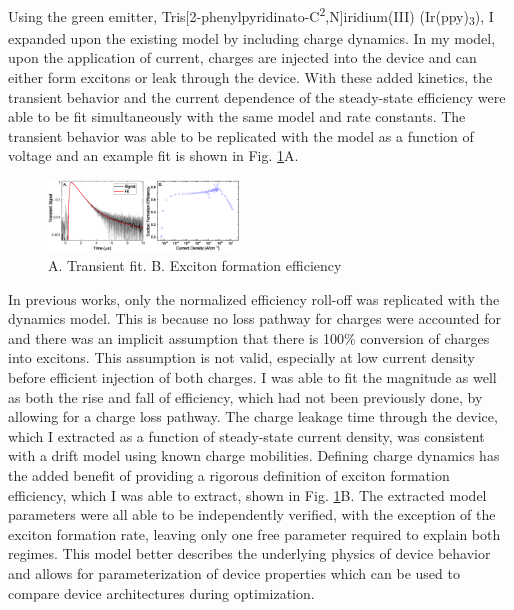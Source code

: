 \documentclass[a4paper,titlepage]{article}
\begin{document}
Using the green emitter, Tris[2-phenylpyridinato-C\textsuperscript{2},N]iridium(III) (Ir(ppy)\textsubscript{3}), I expanded upon the existing model by including charge dynamics.
In my model, upon the application of current, charges are injected into the device and can either form excitons or leak through the device.
With these added kinetics, the transient behavior and the current dependence of the steady-state efficiency were able to be fit simultaneously with the same model and rate constants.
The transient behavior was able to be replicated with the model as a function of voltage and an example fit is shown in Fig. \ref{unified}A.

\begin{figure}
\vspace{-15pt}
\includegraphics[width=0.45\textwidth]{unified.eps}
\caption{A. Transient fit. B. Exciton formation efficiency}
\label{unified}
\vspace{-20pt}
\end{figure}

In previous works, only the normalized efficiency roll-off was replicated with the dynamics model.
This is because no loss pathway for charges were accounted for and there was an implicit assumption that there is 100\% conversion of charges into excitons.
This assumption is not valid, especially at low current density before efficient injection of both charges.
I was able to fit the magnitude as well as both the rise and fall of efficiency, which had not been previously done, by allowing for a charge loss pathway.
The charge leakage time through the device, which I extracted as a function of steady-state current density, was consistent with a drift model using known charge mobilities.
Defining charge dynamics has the added benefit of providing a rigorous definition of exciton formation efficiency, which I was able to extract, shown in Fig. \ref{unified}B.
The extracted model parameters were all able to be independently verified, with the exception of the exciton formation rate, leaving only one free parameter required to explain both regimes.
This model better describes the underlying physics of device behavior and allows for parameterization of device properties which can be used to compare device architectures during optimization.
\end{document}
